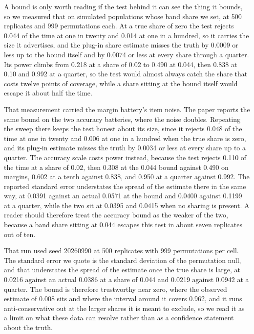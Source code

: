A bound is only worth reading if the test behind it can see the thing it bounds, so we measured that on simulated populations whose band share we set, at 500 replicates and 999 permutations each. At a true share of zero the test rejects 0.044 of the time at one in twenty and 0.014 at one in a hundred, so it carries the size it advertises, and the plug-in share estimate misses the truth by 0.0009 or less up to the bound itself and by 0.0074 or less at every share through a quarter. Its power climbs from 0.218 at a share of 0.02 to 0.490 at 0.044, then 0.838 at 0.10 and 0.992 at a quarter, so the test would almost always catch the share that costs twelve points of coverage, while a share sitting at the bound itself would escape it about half the time.

That measurement carried the margin battery's item noise. The paper reports the same bound on the two accuracy batteries, where the noise doubles. Repeating the sweep there keeps the test honest about its size, since it rejects 0.048 of the time at one in twenty and 0.006 at one in a hundred when the true share is zero, and its plug-in estimate misses the truth by 0.0034 or less at every share up to a quarter. The accuracy scale costs power instead, because the test rejects 0.110 of the time at a share of 0.02, then 0.308 at the 0.044 bound against 0.490 on margins, 0.602 at a tenth against 0.838, and 0.950 at a quarter against 0.992. The reported standard error understates the spread of the estimate there in the same way, at 0.0391 against an actual 0.0571 at the bound and 0.0400 against 0.1199 at a quarter, while the two sit at 0.0395 and 0.0415 when no sharing is present. A reader should therefore treat the accuracy bound as the weaker of the two, because a band share sitting at 0.044 escapes this test in about seven replicates out of ten.

That run used seed 20260990 at 500 replicates with 999 permutations per cell. The standard error we quote is the standard deviation of the permutation null, and that understates the spread of the estimate once the true share is large, at 0.0216 against an actual 0.0386 at a share of 0.044 and 0.0219 against 0.0942 at a quarter. The bound is therefore trustworthy near zero, where the observed estimate of 0.008 sits and where the interval around it covers 0.962, and it runs anti-conservative out at the larger shares it is meant to exclude, so we read it as a limit on what these data can resolve rather than as a confidence statement about the truth.

